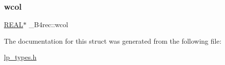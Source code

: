 \subsubsection{\texorpdfstring{wcol}{wcol}}
{\footnotesize\ttfamily \hyperlink{lp__lib_8h_a92bd5e363d131fa73669358edb232dce}{R\+E\+AL}$\ast$ \+\_\+\+B4rec\+::wcol}



The documentation for this struct was generated from the following file\+:\begin{DoxyCompactItemize}
\item 
\hyperlink{lp__types_8h}{lp\+\_\+types.\+h}\end{DoxyCompactItemize}
